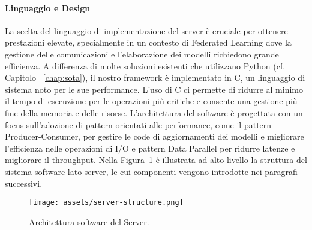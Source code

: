 \documentclass[a4paper, oneside, openright]{report}
\begin{document}
\paragraph{Linguaggio e Design}
La scelta del linguaggio di implementazione del server è cruciale per ottenere prestazioni elevate, specialmente in un contesto di Federated Learning dove la gestione delle comunicazioni e l'elaborazione dei modelli richiedono grande efficienza. A differenza di molte soluzioni esistenti che utilizzano Python (cf. Capitolo ~\ref{chap:sota}), il nostro framework è implementato in C, un linguaggio di sistema noto per le sue performance. L'uso di C ci permette di ridurre al minimo il tempo di esecuzione per le operazioni più critiche e consente una gestione più fine della memoria e delle risorse. L’architettura del software è progettata con un focus sull’adozione di pattern orientati alle performance, come il pattern Producer-Consumer, per gestire le code di aggiornamenti dei modelli e migliorare l’efficienza nelle operazioni di I/O e pattern Data Parallel per ridurre latenze e migliorare il throughput.
Nella Figura~\ref{fig:server-structure} è illustrata ad alto livello la struttura del sistema software lato server, le cui componenti vengono introdotte nei paragrafi successivi.


\begin{figure}[h]
\centering
\texttt{[image: assets/server-structure.png]}
\caption{Architettura software del Server.}\label{fig:server-structure}
\end{figure}
\end{document}
